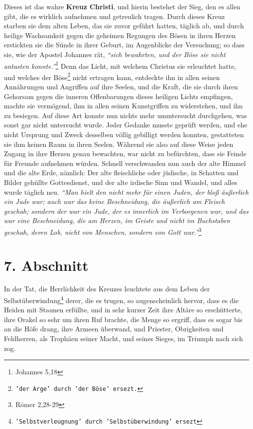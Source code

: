 Dieses ist das wahre \textbf{Kreuz Christi}, und hierin bestehet der Sieg, den
es allen gibt, die es wirklich aufnehmen und getreulich tragen. Durch dieses
Kreuz starben sie dem alten Leben, das sie zuvor geführt hatten, täglich ab, und
durch heilige Wachsamkeit gegen die geheimen Regungen des Bösen in ihren Herzen
erstickten sie die Sünde in ihrer Geburt, im Augenblicke der Versuchung; so dass
sie, wie der Apostel Johannes rät,
\textit{"`sich bewahrten, und der Böse sie nicht antasten
konnte."'}\footnote{Johannes 5,18}
Denn das Licht, mit welchem Christus sie erleuchtet hatte, und welches der
Böse\footnote{\texttt{'der Arge' durch 'der Böse' ersezt.}}
nicht ertragen kann, entdeckte ihn in allen seinen Annährungen und Angriffen auf
ihre Seelen, und die Kraft, die sie durch ihren Gehorsam gegen die inneren
Offenbarungen dieses heiligen Lichts empfingen, machte sie vermögend, ihm in
allen seinen Kunstgriffen zu widerstehen, und ihn zu besiegen. Auf diese Art
konnte nun nichts mehr ununtersucht durchgehen, was sonst gar nicht untersucht
wurde. Jeder Gedanke musste geprüft werden, und ehe nicht Ursprung und Zweck
desselben völlig gebilligt werden konnten, gestatteten sie ihm keinen Raum in
ihren Seelen. Während sie also auf diese Weise jeden Zugang in ihre Herzen genau
bewachten, war nicht zu befürchten, dass sie Feinde für Freunde aufnehmen
würden.
Schnell verschwanden nun auch der alte Himmel und die alte Erde, nämlich: Der
alte fleischliche oder jüdische, in Schatten und Bilder gehüllte Gottesdienst,
und der alte irdische Sinn und Wandel, und alles wurde täglich neu.
\textit{"`Man hielt
den nicht mehr für einen Juden, der bloß äußerlich ein Jude war; auch war das
keine Beschneidung, die äußerlich am Fleisch geschah; sondern der war ein Jude,
der es innerlich im Verborgenen war, und das war eine Beschneidung, die am
Herzen, im Geiste und nicht im Buchstaben geschah, deren Lob, nicht von
Menschen, sondern von Gott war."'}\footnote{Römer 2,28-29}

\section{7. Abschnitt}  \label{kap2_ab7}

In der Tat, die Herrlichkeit des Kreuzes leuchtete aus dem Leben der
Selbstüberwindung\footnote{\texttt{'Selbstverleugnung' durch 'Selbstüberwindung'
ersezt}}
derer, die es trugen, so augenscheinlich hervor, dass es die
Heiden mit Staunen erfüllte, und in sehr kurzer Zeit ihre Altäre so
erschütterte, ihre Orakel so sehr um ihren Ruf brachte, die Menge so ergriff,
dass es sogar bis an die Höfe drang, ihre Armeen überwand, und Priester,
Obrigkeiten und Feldherren, als Trophäen seiner Macht, und seines Sieges, im
Triumph nach sich zog.


